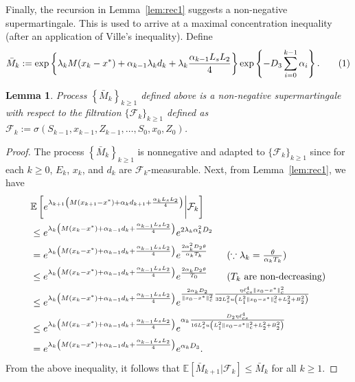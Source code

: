\documentclass{article}
\newcommand{\numberthis}{\addtocounter{equation}{1}\tag{\theequation}}
\newcommand{\lrset}[1]{\left\{ #1 \right\}}
\newcommand{\lrp}[1]{\left( #1 \right)}
\newcommand{\lrs}[1]{\left[ #1 \right]}
\newcommand{\E}[1]{\mathbb{E}\lrs{#1}}
\newcommand{\lcs}{\ell_{cs}}
\newcommand{\xk}{x_k}
\newtheorem{lemma}[theorem]{Lemma}
\begin{document}
Finally, the recursion in Lemma~\ref{lem:rec1} suggests a non-negative supermartingale. This is used to arrive at a maximal concentration inequality (after an application of Ville's inequality). Define 
\[ \bar{M}_k := \exp\lrset{  \lambda_{k} M(\xk - x^*) + \alpha_{k-1}\lambda_{k}d_k + \lambda_{k}\frac{\alpha_{k-1} L_s L_2}{4} }  \exp\lrset{-D_3\sum\limits_{i=0}^{k-1}\alpha_i }. \numberthis\label{eq:defMbar} \]

\begin{lemma}\label{lem:martingale}  Process $\lrset{\bar{M}_k}_{k\geq 1}$ defined above is a non-negative supermartingale with respect to the filtration $\{\mathcal F_k\}_{k\geq 1}$ defined as $\mathcal F_k := \sigma(S_{k-1}, x_{k-1}, Z_{k-1},\dots,S_0, x_0, Z_0)$.
\end{lemma}
\begin{proof}
The process $\lrset{\bar{M}_k}_{k\geq 1}$ is nonnegative and adapted to $\{\mathcal F_k\}_{k\geq 1}$ since for each $k\ge 0$, $E_k$, $x_k$, and $d_k$ are $\mathcal F_k$-measurable. Next, from Lemma~\ref{lem:rec1}, we have 
    \begin{align*}
        &\E{ e^{\lambda_{k+1}\lrp{M(x_{k+1} - x^*) + \alpha_k d_{k+1} + \frac{\alpha_k L_sL_2 }{4} }} \bigg| \mathcal F_k }\\
        &\le e^{ \lambda_{k}\lrp{ M(\xk - x^*) + \alpha_{k-1}d_k + \frac{\alpha_{k-1} L_sL_2}{4} }}  e^{2 \lambda_k \alpha^2_k D_2 }\\
        &= e^{ \lambda_{k}\lrp{ M(\xk - x^*) + \alpha_{k-1}d_k + \frac{\alpha_{k-1} L_sL_2}{4} }}  e^{\frac{2\alpha^2_k D_2\theta}{\alpha_k T_k} } \tag{$\because  \lambda_k = \frac{\theta}{\alpha_k T_k}$}\\
        &\le e^{ \lambda_{k}\lrp{ M(\xk - x^*) + \alpha_{k-1}d_k + \frac{\alpha_{k-1} L_sL_2}{4} }}  e^{\frac{2\alpha_k D_2\theta}{T_0} } \tag{$T_k$ are non-decreasing}\\
        &\le e^{ \lambda_{k}\lrp{ M(\xk - x^*) + \alpha_{k-1}d_k + \frac{\alpha_{k-1} L_sL_2}{4} }}  e^{\frac{2\alpha_k D_2 }{\|x_0- x^*\|^2_c} \frac{\eta \lcs^4 \|x_0 - x^*\|^2_c}{32 L^2_s u  \lrp{L^2_1\|x_0 - x^*\|^2_c + L^2_2 + B^2_2} }} \\
        &\le e^{ \lambda_{k}\lrp{ M(\xk - x^*) + \alpha_{k-1}d_k + \frac{\alpha_{k-1} L_sL_2}{4} }}  e^{\alpha_k\frac{ D_2 \eta \lcs^4 }{16 L^2_s u  \lrp{L^2_1\|x_0 - x^*\|^2_c + L^2_2 + B^2_2} }}\\
        &= e^{ \lambda_{k}\lrp{ M(\xk - x^*) + \alpha_{k-1}d_k + \frac{\alpha_{k-1} L_sL_2}{4} }}  e^{\alpha_k D_3}.
    \end{align*}
 From the above inequality, it follows that $\E{\bar{M}_{k+1} | \mathcal F_k} \le \bar{M}_k$ for all $k\ge 1$.
\end{proof}
\end{document}
